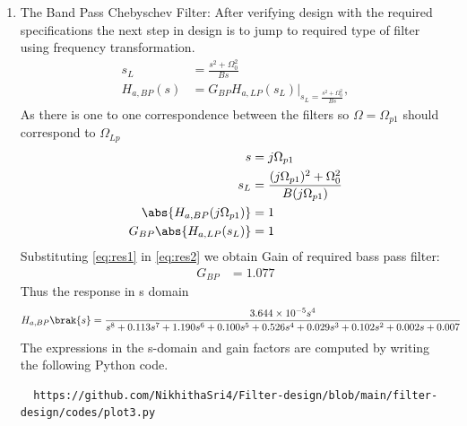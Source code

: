 \documentclass{article}
\begin{document}
\begin{enumerate}
\item {The Band Pass Chebyschev Filter:} 
After verifying design with the required specifications the next step in design is to jump to required type of filter using frequency transformation. 
\begin{align}
    s_L &= \frac{s^2 + \Omega_0^2}{Bs} \\
    H_{a,BP}(s) &= G_{BP}H_{a,LP}(s_L)\vert_{s_L = \frac{s^2 + \Omega_0^2}{Bs}},
\end{align}
As there is one to one correspondence between the filters so $\Omega=\Omega_{p1}$ should correspond to $\Omega_{Lp}$
\begin{align}
    s &= j\Omega_{p1}\\
    s_{L} &= \frac{(j\Omega_{p1})^2 + \Omega_0^2}{B(j\Omega_{p1})} \label{eq:res1} \\ 
    \abs{H_{a,BP}(j\Omega_{p1})} &= 1 \\
    G_{BP}\abs{H_{a,LP}(s_L)} &= 1 \label{eq:res2}
\end{align}
Substituting \eqref{eq:res1} in \eqref{eq:res2} we obtain Gain of required bass pass filter:
\begin{align}
    G_{BP} &= 1.077
\end{align}
Thus the response in s domain 
\begin{align}
    H_{a,BP}\brak{s} &= \frac{3.644\times 10^{-5}s^4}{s^8 + 0.113s^7 + 1.190s^6 + 0.100s^5 + 0.526s^4 + 0.029s^3 + 0.102s^2 + 0.002s + 0.007} \label{eq:magnitude_bandpass_sdom}
\end{align}
The expressions in the s-domain and gain factors are computed by writing the following Python code. 
\begin{lstlisting}
  https://github.com/NikhithaSri4/Filter-design/blob/main/filter-design/codes/plot3.py 
\end{lstlisting}
    

\end{enumerate}
\end{document}
